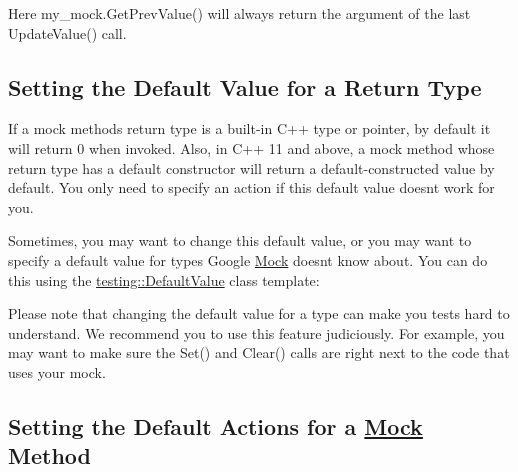 Here {\ttfamily my\+\_\+mock.\+Get\+Prev\+Value()} will always return the argument of the last {\ttfamily Update\+Value()} call.

\subsection*{Setting the Default Value for a Return Type}

If a mock method\textquotesingle{}s return type is a built-\/in C++ type or pointer, by default it will return 0 when invoked. Also, in C++ 11 and above, a mock method whose return type has a default constructor will return a default-\/constructed value by default. You only need to specify an action if this default value doesn\textquotesingle{}t work for you.

Sometimes, you may want to change this default value, or you may want to specify a default value for types Google \mbox{\hyperlink{class_mock}{Mock}} doesn\textquotesingle{}t know about. You can do this using the {\ttfamily \mbox{\hyperlink{classtesting_1_1_default_value}{testing\+::\+Default\+Value}}} class template\+:


\begin{DoxyCode}{0}
\DoxyCodeLine{\};}
\DoxyCodeLine{}
\DoxyCodeLine{}
\DoxyCodeLine{}
\DoxyCodeLine{}
\DoxyCodeLine{}
\end{DoxyCode}


Please note that changing the default value for a type can make you tests hard to understand. We recommend you to use this feature judiciously. For example, you may want to make sure the {\ttfamily Set()} and {\ttfamily Clear()} calls are right next to the code that uses your mock.

\subsection*{Setting the Default Actions for a \mbox{\hyperlink{class_mock}{Mock}} Method}

